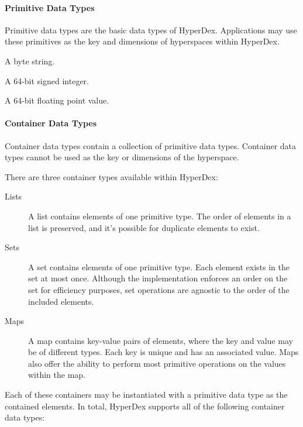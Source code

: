 \paragraph{Primitive Data Types}

Primitive data types are the basic data types of HyperDex.  Applications may use
these primitives as the key and dimensions of hyperspaces within HyperDex.

\begin{description}[noitemsep]
\item[\code{HYPERDATATYPE\_STRING}] A byte string.
\item[\code{HYPERDATATYPE\_INT64}] A 64-bit signed integer.
\item[\code{HYPERDATATYPE\_FLOAT}] A 64-bit floating point value.
\end{description}

\paragraph{Container Data Types}

Container data types contain a collection of primitive data types.  Container
data types cannot be used as the key or dimensions of the hyperspace.

There are three container types available within HyperDex:

\begin{description}
\item[Lists] A list contains elements of one primitive type.  The order of
    elements in a list is preserved, and it's possible for duplicate elements to
    exist.
\item[Sets] A set contains elements of one primitive type.  Each element exists
    in the set at most once.  Although the implementation enforces an order on
    the set for efficiency purposes, set operations are agnostic to the order of
    the included elements.
\item[Maps] A map contains key-value pairs of elements, where the key and value
    may be of different types.  Each key is unique and has an associated value.
    Maps also offer the ability to perform most primitive operations on the
    values within the map.
\end{description}

Each of these containers may be instantiated with a primitive data type as the
contained elements.  In total, HyperDex supports all of the following container
data types:


